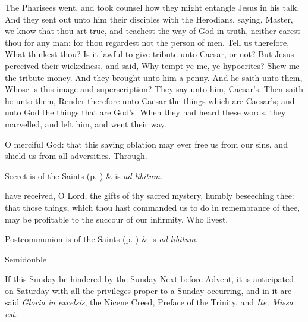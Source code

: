
 The Pharisees went, and took counsel how they might entangle Jesus in his talk. And they sent out unto him their disciples with the Herodians, saying, Master, we know that thou art true, and teachest the way of God in truth, neither carest thou for any man: for thou regardest not the person of men. Tell us therefore, What thinkest thou? Is it lawful to give tribute unto Caesar, or not? But Jesus perceived their wickedness, and said, Why tempt ye me, ye hypocrites? Shew me the tribute money. And they brought unto him a penny. And he saith unto them, Whose is this image and superscription? They say unto him, Caesar's. Then saith he unto them, Render therefore unto Caesar the things which are Caesar's; and unto God the things that are God's. When they had heard these words, they marvelled, and left him, and went their way.


\secret
{} O merciful God: that this saving oblation may ever free us from our sins, and shield us from all adversities. Through.
\begin{rubric}
     Secret is of the Saints (p. \pageref{SPSaints}) \&  is \emph{ad libitum}.
\end{rubric}


\postcommunion
{} have received, O Lord, the gifts of thy sacred mystery, humbly beseeching thee: that those things, which thou hast commanded us to do in remembrance of thee, may be profitable to the succour of our infirmity. Who livest.
\begin{rubric}
     Postcommunion is of the Saints (p. \pageref{SPSaints}) \&  is \emph{ad libitum}.
\end{rubric}

\begin{inhead}
{Semidouble}
\end{inhead}
\begin{rubric}
If this Sunday be hindered by the Sunday Next before Advent, it is anticipated on Saturday with all the privileges proper to a Sunday occurring, and in it are said \emph{Gloria in excelsis}, the Nicene Creed, Preface of the Trinity, and \emph{Ite, Missa est}.
\end{rubric}

